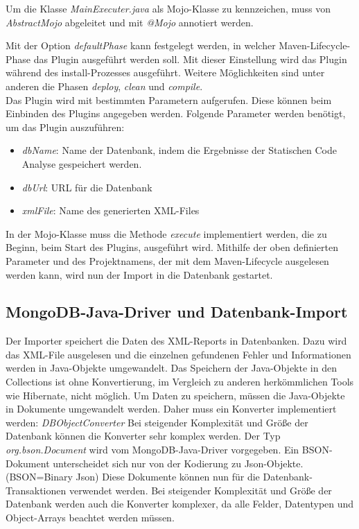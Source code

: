 Um die Klasse \textit{MainExecuter.java} als Mojo-Klasse zu kennzeichen, muss von \textit{AbstractMojo} abgeleitet und mit \textit{@Mojo} annotiert werden.


Mit der Option \textit{defaultPhase} kann festgelegt werden, in welcher Maven-Lifecycle-Phase das Plugin ausgeführt werden soll. Mit dieser Einstellung wird das Plugin während des install-Prozesses ausgeführt. Weitere Möglichkeiten sind unter anderen die Phasen  \textit{deploy},  \textit{clean} und  \textit{compile}. \\

Das Plugin wird mit bestimmten Parametern aufgerufen. Diese können beim Einbinden des Plugins angegeben werden. Folgende Parameter werden benötigt, um das Plugin auszuführen:

\begin{itemize}
\item \textit{dbName}: Name der Datenbank, indem die Ergebnisse der Statischen Code Analyse gespeichert werden. 
\item \textit{dbUrl}: URL für die Datenbank
\item \textit{xmlFile}: Name des generierten XML-Files
\end{itemize}
  

In der Mojo-Klasse muss die Methode \textit{execute} implementiert werden, die zu Beginn, beim Start des Plugins, ausgeführt wird. Mithilfe der oben definierten Parameter und des Projektnamens, der mit dem Maven-Lifecycle ausgelesen werden kann, wird nun der Import in die Datenbank gestartet. 

\subsection{MongoDB-Java-Driver und Datenbank-Import}
Der Importer speichert die Daten des XML-Reports in Datenbanken. Dazu wird das XML-File ausgelesen und die einzelnen gefundenen Fehler und Informationen werden in Java-Objekte umgewandelt. Das Speichern der Java-Objekte in den Collections ist ohne Konvertierung, im Vergleich zu anderen herkömmlichen Tools wie Hibernate, nicht möglich. Um Daten zu speichern, müssen die Java-Objekte in Dokumente umgewandelt werden. Daher muss ein Konverter implementiert werden: \textit{DBObjectConverter}
Bei steigender Komplexität und Größe der Datenbank können die Konverter sehr komplex werden. Der Typ \textit{org.bson.Document} wird vom MongoDB-Java-Driver vorgegeben. Ein BSON-Dokument unterscheidet sich nur von der Kodierung zu Json-Objekte. (BSON=Binary Json) 
Diese Dokumente können nun für die Datenbank-Transaktionen verwendet werden. Bei steigender Komplexität und Größe der Datenbank werden auch die Konverter komplexer, da alle Felder, Datentypen und Object-Arrays beachtet werden müssen.
 \\

